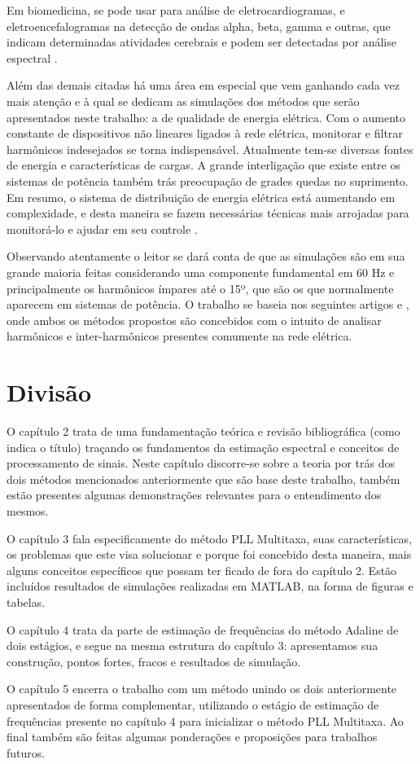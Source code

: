 Em biomedicina, se pode usar para análise de eletrocardiogramas, e eletroencefalogramas na detecção de ondas alpha, beta, gamma e outras, que indicam determinadas atividades cerebrais e podem ser detectadas por análise espectral \cite{sornmo2005bioelectrical}.  

Além das demais citadas há uma área em especial que vem ganhando cada vez mais atenção e à qual se dedicam as simulações dos métodos que serão apresentados neste trabalho: a de qualidade de energia elétrica. Com o aumento constante de dispositivos não lineares ligados à rede elétrica, monitorar e filtrar harmônicos indesejados se torna indispensável. Atualmente tem-se diversas fontes de energia e características de cargas. A grande interligação que existe entre os sistemas de potência também trás preocupação de grades quedas no suprimento. Em resumo, o sistema de distribuição de energia elétrica está aumentando em complexidade, e desta maneira se fazem necessárias técnicas mais arrojadas para monitorá-lo e ajudar em seu controle \cite{dugan1996electrical}.

Observando atentamente o leitor se dará conta de que as simulações são em sua grande maioria feitas considerando uma componente fundamental em 60 Hz e principalmente os harmônicos ímpares até o 15º, que são os que normalmente aparecem em sistemas de potência. O trabalho se baseia nos seguintes artigos \cite{de2009pll} e \cite{chang2009two}, onde ambos os métodos propostos são concebidos com o intuito de analisar harmônicos e inter-harmônicos presentes comumente na rede elétrica.

\section{Divisão}

O capítulo 2 trata de uma fundamentação teórica e revisão bibliográfica (como indica o título) traçando os fundamentos da estimação espectral e conceitos de processamento de sinais. Neste capítulo discorre-se sobre a teoria por trás dos dois métodos mencionados anteriormente que são base deste trabalho, também estão presentes algumas demonstrações relevantes para o entendimento dos mesmos. 

O capítulo 3 fala especificamente do método PLL Multitaxa, suas características, os problemas que este visa solucionar e porque foi concebido desta maneira, mais alguns conceitos específicos que possam ter ficado de fora do capítulo 2. Estão incluídos resultados de simulações realizadas em MATLAB, na forma de figuras e tabelas.

O capítulo 4 trata da parte de estimação de frequências do método Adaline de dois estágios, e segue na mesma estrutura do capítulo 3: apresentamos sua construção, pontos fortes, fracos e resultados de simulação.

O capítulo 5 encerra o trabalho com um método unindo os dois anteriormente apresentados de forma complementar, utilizando o estágio de estimação de frequências presente no capítulo 4 para inicializar o método PLL Multitaxa. Ao final também são feitas algumas ponderações e proposições para trabalhos futuros.